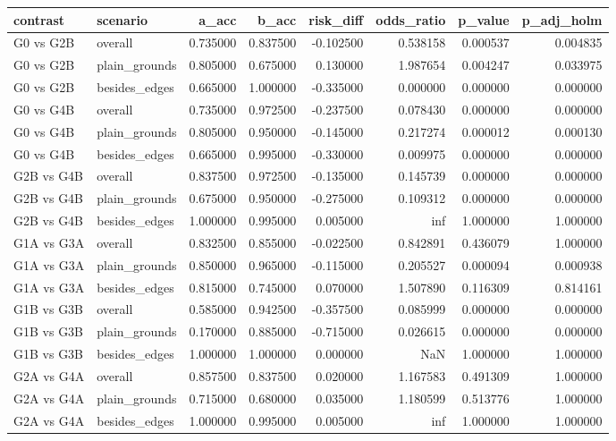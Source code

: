 \begin{tabular}{llrrrrrr}
\toprule
contrast & scenario & a_acc & b_acc & risk_diff & odds_ratio & p_value & p_adj_holm \\
\midrule
G0 vs G2B & overall & 0.735000 & 0.837500 & -0.102500 & 0.538158 & 0.000537 & 0.004835 \\
G0 vs G2B & plain_grounds & 0.805000 & 0.675000 & 0.130000 & 1.987654 & 0.004247 & 0.033975 \\
G0 vs G2B & besides_edges & 0.665000 & 1.000000 & -0.335000 & 0.000000 & 0.000000 & 0.000000 \\
G0 vs G4B & overall & 0.735000 & 0.972500 & -0.237500 & 0.078430 & 0.000000 & 0.000000 \\
G0 vs G4B & plain_grounds & 0.805000 & 0.950000 & -0.145000 & 0.217274 & 0.000012 & 0.000130 \\
G0 vs G4B & besides_edges & 0.665000 & 0.995000 & -0.330000 & 0.009975 & 0.000000 & 0.000000 \\
G2B vs G4B & overall & 0.837500 & 0.972500 & -0.135000 & 0.145739 & 0.000000 & 0.000000 \\
G2B vs G4B & plain_grounds & 0.675000 & 0.950000 & -0.275000 & 0.109312 & 0.000000 & 0.000000 \\
G2B vs G4B & besides_edges & 1.000000 & 0.995000 & 0.005000 & inf & 1.000000 & 1.000000 \\
G1A vs G3A & overall & 0.832500 & 0.855000 & -0.022500 & 0.842891 & 0.436079 & 1.000000 \\
G1A vs G3A & plain_grounds & 0.850000 & 0.965000 & -0.115000 & 0.205527 & 0.000094 & 0.000938 \\
G1A vs G3A & besides_edges & 0.815000 & 0.745000 & 0.070000 & 1.507890 & 0.116309 & 0.814161 \\
G1B vs G3B & overall & 0.585000 & 0.942500 & -0.357500 & 0.085999 & 0.000000 & 0.000000 \\
G1B vs G3B & plain_grounds & 0.170000 & 0.885000 & -0.715000 & 0.026615 & 0.000000 & 0.000000 \\
G1B vs G3B & besides_edges & 1.000000 & 1.000000 & 0.000000 & NaN & 1.000000 & 1.000000 \\
G2A vs G4A & overall & 0.857500 & 0.837500 & 0.020000 & 1.167583 & 0.491309 & 1.000000 \\
G2A vs G4A & plain_grounds & 0.715000 & 0.680000 & 0.035000 & 1.180599 & 0.513776 & 1.000000 \\
G2A vs G4A & besides_edges & 1.000000 & 0.995000 & 0.005000 & inf & 1.000000 & 1.000000 \\
\bottomrule
\end{tabular}
